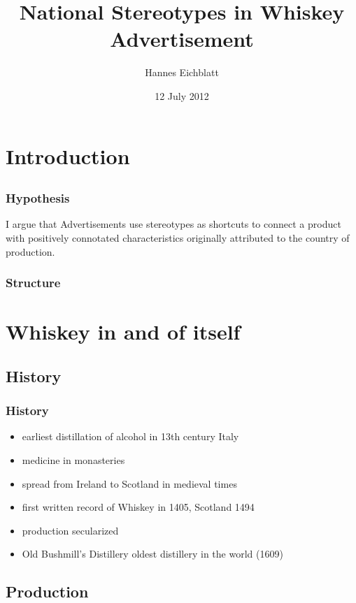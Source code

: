 \documentclass{beamer}
\title{National Stereotypes in Whiskey Advertisement}
\institute{Institut für Anglistik\\Universität Leipzig}
\author{Hannes Eichblatt}
\date{12 July 2012}
\begin{document}
\frame[plain]{\maketitle}

\section{Introduction}
\subsection{}

\begin{frame}
 \frametitle{Hypothesis}
 \begin{block}{I argue that}
  Advertisements use stereotypes as shortcuts to connect a product with positively connotated characteristics originally attributed to the country of production.
 \end{block}
\end{frame}

\begin{frame}
 \frametitle{Structure}
 \tableofcontents
\end{frame}

\section{Whiskey in and of itself}
\subsection{History}

\begin{frame}
 \frametitle{History}
 \begin{itemize}
  \item earliest distillation of alcohol in 13th century Italy
  \item medicine in monasteries
  \item spread from Ireland to Scotland in medieval times
  \item first written record of Whiskey in 1405, Scotland 1494
  \item production secularized
  \item Old Bushmill's Distillery oldest distillery in the world (1609)
 \end{itemize}
\end{frame}

\subsection{Production}
\end{document}

